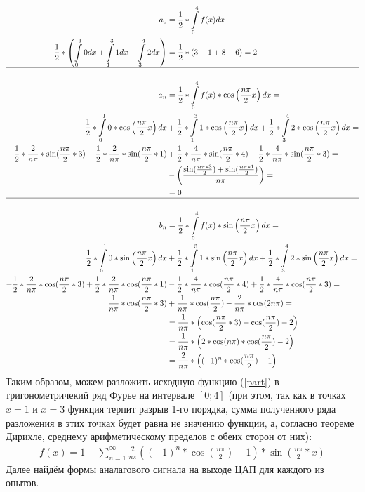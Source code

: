 \documentclass[12pt, a4paper]{article}
\begin{document}
\begin{equation*}
\begin{aligned}
a_0 &= \frac{1}{2}*\int\limits_{0}^{4}f(x)dx\\
\frac{1}{2}*\left(\int\limits_{0}^{1} 0 dx + \int\limits_{1}^{3}1 dx + \int\limits_{3}^{4}2 dx\right) &= \frac{1}{2}*\left( 3 - 1 +8 - 6\right) = 2\\
\hline\\
a_n &= \frac{1}{2}*\int\limits_{0}^{4}f(x)*\cos\left(\frac{n\pi}{2}x\right)dx=\\
\frac{1}{2}*\int\limits_{0}^{1} 0*\cos\left(\frac{n\pi}{2}x\right) dx &+ \frac{1}{2}*\int\limits_{1}^{3}1 * \cos\left(\frac{n\pi}{2}x\right) dx + \frac{1}{2}*\int\limits_{3}^{4}2*\cos\left(\frac{n\pi}{2}x\right) dx=\\
\frac{1}{2}*\frac{2}{n\pi}*\sin(\frac{n\pi}{2} * 3) - \frac{1}{2}*\frac{2}{n\pi}*\sin(\frac{n\pi}{2} * 1) &+ \frac{1}{2}*\frac{4}{n\pi}*\sin(\frac{n\pi}{2} * 4) - \frac{1}{2}*\frac{4}{n\pi}*\sin(\frac{n\pi}{2} * 3)=\\
&-\left(\frac{\sin(\frac{n\pi*3}{2})+\sin(\frac{n\pi*1}{2})}{n\pi}\right)=\\
&=0\\
\hline\\
b_n &= \frac{1}{2}*\int\limits_{0}^{4}f(x)*\sin\left(\frac{n\pi}{2}x\right)dx=\\
\frac{1}{2}*\int\limits_{0}^{1} 0*\sin\left(\frac{n\pi}{2}x\right) dx &+ \frac{1}{2}*\int\limits_{1}^{3}1 * \sin\left(\frac{n\pi}{2}x\right) dx + \frac{1}{2}*\int\limits_{3}^{4}2*\sin\left(\frac{n\pi}{2}x\right) dx=\\
-\frac{1}{2}*\frac{2}{n\pi}*\cos(\frac{n\pi}{2} * 3) + \frac{1}{2}*\frac{2}{n\pi}*\cos(\frac{n\pi}{2} * 1) &- \frac{1}{2}*\frac{4}{n\pi}*\cos(\frac{n\pi}{2} * 4) + \frac{1}{2}*\frac{4}{n\pi}*\cos(\frac{n\pi}{2} * 3)=\\
\frac{1}{n\pi}*\cos(\frac{n\pi}{2} * 3) &+ \frac{1}{n\pi}*\cos(\frac{n\pi}{2}) -\frac{2}{n\pi}*\cos(2n\pi)=\\
&=\frac{1}{n\pi}*\left(\cos(\frac{n\pi}{2} * 3)+ \cos(\frac{n\pi}{2})-2\right)\\
&=\frac{1}{n\pi}*\left(2*\cos(n\pi)*\cos(\frac{n\pi}{2})-2\right)\\
&=\frac{2}{n\pi}*\left((-1)^n*\cos(\frac{n\pi}{2})-1\right)
\end{aligned}
\end{equation*}
Таким образом, можем разложить исходную функцию (\ref{part}) в тригонометричекий ряд Фурье на интервале $\left[0;4\right]$ (при этом, так как в точках $x=1$ и $x=3$ функция терпит разрыв 1-го порядка, сумма полученного ряда разложения в этих точках будет равна не значению функции, а, согласно теореме Дирихле, среднему арифметическому пределов с обеих сторон от них):
 \begin{equation}\label{fourier}
\begin{aligned}
f(x)=1+\sum_{n=1}^{\infty}\frac{2}{n\pi}\left((-1)^n*\cos(\frac{n\pi}{2})-1\right)*\sin(\frac{n\pi}{2}*x)
\end{aligned}
\end{equation}
Далее найдём формы аналагового сигнала на выходе ЦАП для каждого из опытов.
\end{document}
